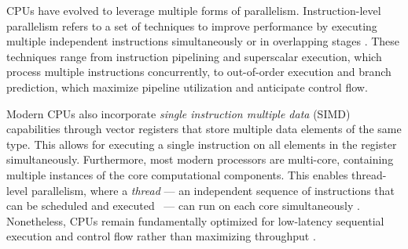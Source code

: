 \documentclass[english,12pt,a4paper,pdftex,sci,utf8]{aaltothesis}
\begin{document}
CPUs have evolved to leverage multiple forms of parallelism. Instruction-level parallelism refers to a set of techniques to improve performance by executing multiple independent instructions simultaneously or in overlapping stages \cite{hennessy2011computer, suomela_ppc}. These techniques range from instruction pipelining and superscalar execution, which process multiple instructions concurrently, to out-of-order execution and branch prediction, which maximize pipeline utilization and anticipate control flow.

Modern CPUs also incorporate \emph{single instruction multiple data} (SIMD) capabilities through vector registers that store multiple data elements of the same type. This allows for executing a single instruction on all elements in the register simultaneously. Furthermore, most modern processors are multi-core, containing multiple instances of the core computational components. This enables thread-level parallelism, where a \emph{thread} --- an independent sequence of instructions that can be scheduled and \mbox{executed \cite{stallings2011operating}} --- can run on each core simultaneously \cite{hennessy2011computer, suomela_ppc}. Nonetheless, CPUs remain fundamentally optimized for low-latency sequential execution and control flow rather than maximizing throughput \cite{hennessy2011computer, suomela_ppc}.
\end{document}

